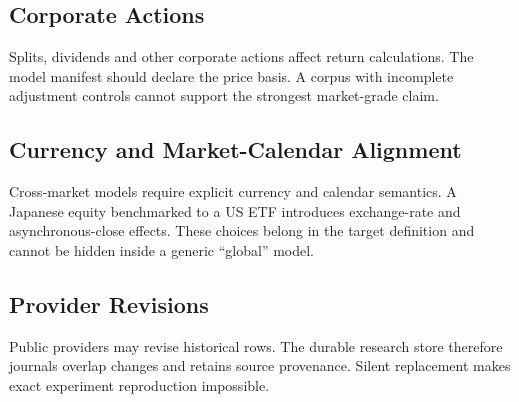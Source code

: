 \documentclass[11pt]{article}
\begin{document}
\subsection{Corporate Actions}
Splits, dividends and other corporate actions affect return calculations. The model manifest should declare the price basis. A corpus with incomplete adjustment controls cannot support the strongest market-grade claim.

\subsection{Currency and Market-Calendar Alignment}
Cross-market models require explicit currency and calendar semantics. A Japanese equity benchmarked to a US ETF introduces exchange-rate and asynchronous-close effects. These choices belong in the target definition and cannot be hidden inside a generic ``global'' model.

\subsection{Provider Revisions}
Public providers may revise historical rows. The durable research store therefore journals overlap changes and retains source provenance. Silent replacement makes exact experiment reproduction impossible.
\end{document}
